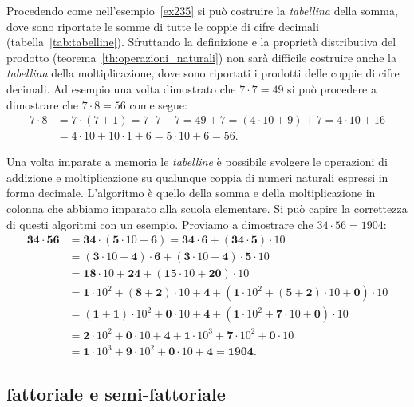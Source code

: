 Procedendo come nell'esempio~\ref{ex235} si può costruire la \emph{tabellina}
della somma, dove sono riportate le somme di tutte le coppie di cifre decimali
(tabella~\ref{tab:tabelline}).
Sfruttando la definizione e la proprietà distributiva del prodotto 
(teorema~\ref{th:operazioni_naturali})
non sarà difficile 
costruire anche la \emph{tabellina} della moltiplicazione, dove sono riportati i prodotti delle 
coppie di cifre decimali. 
Ad esempio una volta dimostrato che $7\cdot 7 = 49$ si può procedere 
a dimostrare che $7\cdot 8 = 56$ come segue:
\begin{align*}
  7\cdot 8 &= 7\cdot (7+1) = 7\cdot 7 + 7 = 49+7 
  = (4\cdot 10 + 9) + 7 = 4\cdot 10 + 16 \\
  &= 4\cdot 10 + 10\cdot 1 + 6 = 5\cdot 10 + 6 = 56.
\end{align*}

Una volta imparate a memoria le \emph{tabelline} è possibile svolgere le operazioni di addizione 
e moltiplicazione su qualunque coppia di numeri naturali espressi in forma decimale. 
L'algoritmo è quello della somma e della moltiplicazione in colonna che abbiamo imparato alla 
scuola elementare. Si può capire la correttezza di questi algoritmi con un esempio.
Proviamo a dimostrare che $34\cdot 56 = 1904$:
\begin{align*}
\mathbf{34}\cdot \mathbf{56} 
  &= \mathbf{34}\cdot (\mathbf 5\cdot 10+ \mathbf 6) 
   = \mathbf{34}\cdot \mathbf 6 + (\mathbf{34}\cdot \mathbf 5) \cdot 10 \\
  &= (\mathbf 3\cdot 10 + \mathbf 4)\cdot \mathbf 6 + (\mathbf 3\cdot 10 + \mathbf 4)\cdot \mathbf 5 \cdot 10 \\
  &= \mathbf{18}\cdot 10 + \mathbf{24} + (\mathbf{15}\cdot 10 + \mathbf{20})\cdot 10 \\
  &= \mathbf{1}\cdot 10^2+(\mathbf 8+\mathbf 2)\cdot 10 + \mathbf 4 + (\mathbf 1\cdot 10^2 + (\mathbf 5+\mathbf 2)\cdot 10 + \mathbf 0)\cdot 10 \\
  &= (\mathbf 1+\mathbf 1)\cdot 10^2 +\mathbf 0\cdot 10 + \mathbf 4 + (\mathbf 1\cdot 10^2 + \mathbf 7\cdot 10 + \mathbf 0)\cdot 10 \\
  &= \mathbf 2\cdot 10^2 + \mathbf 0\cdot 10 + \mathbf 4 + \mathbf 1\cdot 10^3+\mathbf 7\cdot 10^2 + \mathbf 0 \cdot 10\\
  &= \mathbf 1\cdot 10^3 + \mathbf 9\cdot 10^2 + \mathbf 0\cdot 10 + \mathbf 4
  = \mathbf{1904}.
\end{align*}

\subsection{fattoriale e semi-fattoriale}

